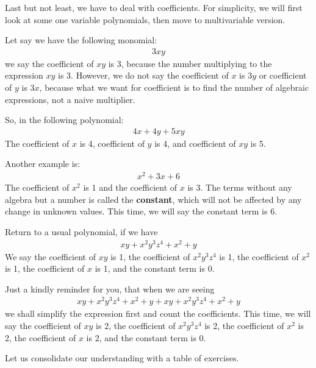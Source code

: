 \documentclass[12pt]{article}
\begin{document}
    Last but not least, we have to deal with coefficients. For simplicity, we will first look at some one variable polynomials, then move to multivariable version.

    Let say we have the following monomial:\begin{align*}
        3xy
    \end{align*} we say the coefficient of $xy$ is 3, because the number multiplying to the expression $xy$ is 3. However, we do not say the coefficient of $x$ is $3y$ or coefficient of $y$ is $3x$, because what we want for coefficient is to find the number of algebraic expressions, not a naive multiplier.

    So, in the following polynomial:\begin{align*}
        4x+4y+5xy
    \end{align*}
    The coefficient of $x$ is 4, coefficient of $y$ is 4, and coefficient of $xy$ is 5.

    Another example is:\begin{align*}
        x^2+3x+6
    \end{align*}
    The coefficient of $x^2$ is 1 and the coefficient of $x$ is 3. The terms without any algebra but a number is called the \textbf{constant}, which will not be affected by any change in unknown values. This time, we will say the constant term is 6.

    Return to a usual polynomial, if we have \begin{align*}
        xy+x^2y^3z^4+x^2+y
    \end{align*}
    We say the coefficient of $xy$ is 1, the coefficient of $x^2y^3z^4$ is 1, the coefficient of $x^2$ is 1, the coefficient of $x$ is 1, and the constant term is 0.

    Just a kindly reminder for you, that when we are seeing \begin{align*}
        xy+x^2y^3z^4+x^2+y+xy+x^2y^3z^4+x^2+y
    \end{align*}
    we shall simplify the expression first and count the coefficients. This time, we will say the coefficient of $xy$ is 2, the coefficient of $x^2y^3z^4$ is 2, the coefficient of $x^2$ is 2, the coefficient of $x$ is 2, and the constant term is 0.

    Let us consolidate our understanding with a table of exercises.
\end{document}

